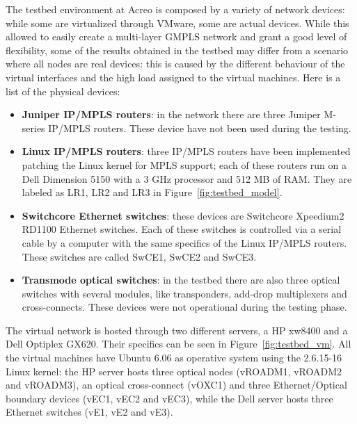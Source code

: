 \documentclass[10pt,a4paper]{report}
\begin{document}
The testbed environment at Acreo is composed by a variety of network
devices: while some are virtualized through VMware, some are actual
devices. While this allowed to easily create a multi-layer GMPLS
network and grant a good level of flexibility, some of the results
obtained in the testbed may differ from a scenario where all nodes are
real devices: this is caused by the different behaviour of the virtual
interfaces and the high load assigned to the virtual machines. Here is
a list of the physical devices:
\begin{itemize}
\item \textbf{Juniper IP/MPLS routers}: in the network there are three
  Juniper M-series IP/MPLS routers. These device have not been used
  during the testing.
\item \textbf{Linux IP/MPLS routers}: three IP/MPLS routers have been
  implemented patching the Linux kernel for MPLS support; each of
  these routers run on a Dell Dimension 5150 with a 3 GHz processor
  and 512 MB of RAM\@. They are labeled as LR1, LR2 and LR3 in
  Figure~\ref{fig:testbed_model}.
\item \textbf{Switchcore Ethernet switches}: these devices are
  Switchcore Xpeedium2 RD1100 Ethernet switches. Each of these
  switches is controlled via a serial cable by a computer with the
  same specifics of the Linux IP/MPLS routers. These switches are
  called SwCE1, SwCE2 and SwCE3.
\item \textbf{Transmode optical switches}: in the testbed there are
  also three optical switches with several modules, like transponders,
  add-drop multiplexers and cross-connects. These devices were not
  operational during the testing phase.
\end{itemize}

The virtual network is hosted through two different servers, a HP
xw8400 and a Dell Optiplex GX620. Their specifics can be seen in
Figure~\ref{fig:testbed_vm}. All the virtual machines have Ubuntu 6.06
as operative system using the 2.6.15-16 Linux kernel: the HP server
hosts three optical nodes (vROADM1, vROADM2 and vROADM3), an optical
cross-connect (vOXC1) and three Ethernet/Optical boundary devices
(vEC1, vEC2 and vEC3), while the Dell server hosts three Ethernet
switches (vE1, vE2 and vE3).
\end{document}
